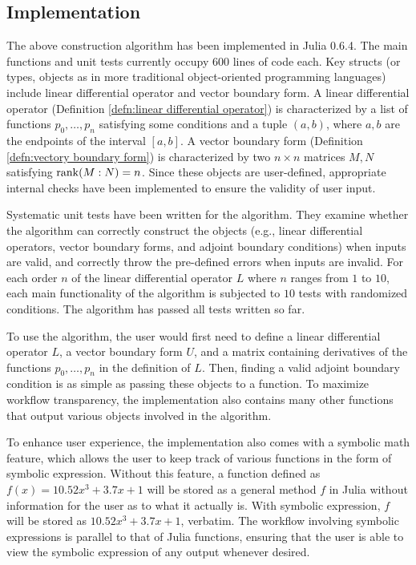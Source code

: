 \documentclass[11pt, oneside, a4paper]{article}
\begin{document}
\subsection{Implementation}
The above construction algorithm has been implemented in Julia 0.6.4. The main functions and unit tests currently occupy $600$ lines of code each. Key structs (or types, objects as in more traditional object-oriented programming languages) include linear differential operator and vector boundary form. A linear differential operator (Definition \ref{defn:linear differential operator}) is characterized by a list of functions $p_0,\ldots, p_n$ satisfying some conditions and a tuple $(a,b)$, where $a, b$ are the endpoints of the interval $[a,b]$. A vector boundary form (Definition \ref{defn:vectory boundary form}) is characterized by two $n\times n$ matrices $M, N$ satisfying $\operatorname{rank}(M:N)=n$. Since these objects are user-defined, appropriate internal checks have been implemented to ensure the validity of user input.

Systematic unit tests have been written for the algorithm. They examine whether the algorithm can correctly construct the objects (e.g., linear differential operators, vector boundary forms, and adjoint boundary conditions) when inputs are valid, and correctly throw the pre-defined errors when inputs are invalid. For each order $n$ of the linear differential operator $L$ where $n$ ranges from $1$ to $10$, each main functionality of the algorithm is subjected to $10$ tests with randomized conditions. The algorithm has passed all tests written so far.

To use the algorithm, the user would first need to define a linear differential operator $L$, a vector boundary form $U$, and a matrix containing derivatives of the functions $p_0,\ldots, p_n$ in the definition of $L$. Then, finding a valid adjoint boundary condition is as simple as passing these objects to a function. To maximize workflow transparency, the implementation also contains many other functions that output various objects involved in the algorithm.

To enhance user experience, the implementation also comes with a symbolic math feature, which allows the user to keep track of various functions in the form of symbolic expression. Without this feature, a function defined as $f(x)=10.52x^3 + 3.7x + 1$ will be stored as a general method $f$ in Julia without information for the user as to what it actually is. With symbolic expression, $f$ will be stored as $10.52x^3 + 3.7x + 1$, verbatim. The workflow involving symbolic expressions is parallel to that of Julia functions, ensuring that the user is able to view the symbolic expression of any output whenever desired.
\end{document}
